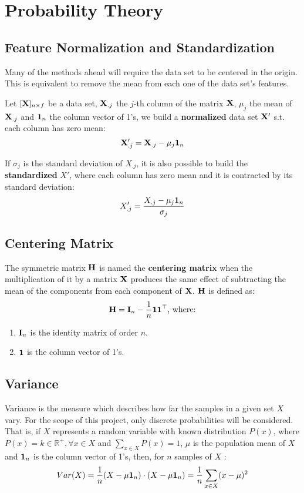 \section{Probability Theory}
\subsection{Feature Normalization and Standardization}
Many of the methods ahead will require the data set to be centered in the origin. This is equivalent to remove the mean from each one of the data set's features.

Let $[\mathbf{X}]_{n \times f}$ be a data set, $\mathbf{X}_{.j}$ the $j$-th column of the matrix $\mathbf{X}$, $\mu_j$ the mean of $\mathbf{X}_{.j}$ and $\mathbf{1}_n$ the column vector of 1's, we build a \textbf{normalized} data set $\mathbf{X}'$ s.t. each column has zero mean:
$$\mathbf{X}'_{.j} = \mathbf{X}_{.j} - \mu_j \mathbf{1}_n$$

If $\sigma_j$ is the standard deviation of $X_{.j}$, it is also possible to build the \textbf{standardized} $X'$, where each column has zero mean and it is contracted by its standard deviation:
$$X'_{.j} = \frac{X_{.j} - \mu_j \mathbf{1}_n}{\sigma_j}$$

\subsection{Centering Matrix}
The symmetric matrix $\mathbf{H}$ is named the \textbf{centering matrix} when the multiplication of it by a matrix $\mathbf{X}$ produces the same effect of subtracting the mean of the components from each component of $\mathbf{X}$. $\mathbf{H}$ is defined as:
$$
\mathbf{H} = \mathbf{I}_n - \frac{1}{n}\mathbf{11}^\top \textnormal{, where:}
$$
\begin{enumerate}
	\item $\mathbf{I}_n$ is the identity matrix of order $n$.
	\item $\mathbf{1}$ is the column vector of 1's.
\end{enumerate}

\subsection{Variance}
Variance is the measure which describes how far the samples in a given set $X$ vary. For the scope of this project, only discrete probabilities will be considered. That is, if $X$ represents a random variable with known distribution $P(x)$, where $P(x) = k \in \mathbb{R}^{+}, \forall x \in X$ and $\sum_{x \in X} P(x) = 1$, $\mu$ is the population mean of $X$ and $\mathbf{1}_n$ is the column vector of 1's, then, for $n$ samples of $X$ \cite{ross2010introductory}:
\begin{align*}
	Var(X) = \frac{1}{n} (X-\mu \mathbf{1}_n) \cdot (X-\mu \mathbf{1}_n) = \frac{1}{n} \sum_{x \in X} (x - \mu)^2
\end{align*}


